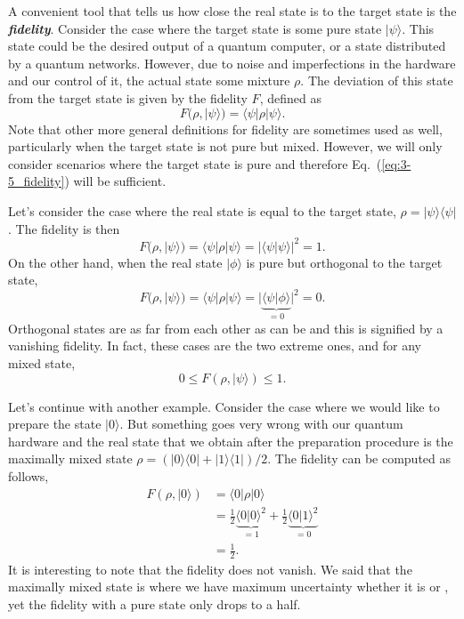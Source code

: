 A convenient tool that tells us how close the real state is to the target state is the \textit{\textbf{fidelity}}.
Consider the case where the target state is some pure state $|\psi\rangle$.
This state could be the desired output of a quantum computer, or a state distributed by a quantum networks.
However, due to noise and imperfections in the hardware and our control of it, the actual state some mixture $\rho$.
The deviation of this state from the target state is given by the fidelity $F$, defined as
\begin{equation}
    F(\rho,|\psi\rangle) = \langle\psi|\rho|\psi\rangle.
    \label{eq:3-5_fidelity}
\end{equation}
Note that other more general definitions for fidelity are sometimes used as well, particularly when the target state is not pure but mixed.
However, we will only consider scenarios where the target state is pure and therefore Eq.~(\ref{eq:3-5_fidelity}) will be sufficient.

Let's consider the case where the real state is equal to the target state, $\rho=|\psi\rangle\langle\psi|$.
The fidelity is then
\begin{equation}
    F(\rho,|\psi\rangle) = \langle\psi|\rho|\psi\rangle = |\langle \psi|\psi \rangle|^2 = 1.
\end{equation}
On the other hand, when the real state $|\phi\rangle$ is pure but orthogonal to the target state,
\begin{equation}
    F(\rho,|\psi\rangle) = \langle\psi|\rho|\psi\rangle = |\underbrace{\langle \psi|\phi \rangle}_{=0}|^2 = 0.
\end{equation}
Orthogonal states are as far from each other as can be and this is signified by a vanishing fidelity.
In fact, these cases are the two extreme ones, and for any mixed state,
\begin{equation}
    0 \leq F(\rho,|\psi\rangle) \leq 1.
\end{equation}

Let's continue with another example.
Consider the case where we would like to prepare the state $|0\rangle$.
But something goes very wrong with our quantum hardware and the real state that we obtain after the preparation procedure is the maximally mixed state $\rho = (|0\rangle\langle0| + |1\rangle\langle1|)/2$.
The fidelity can be computed as follows,
\begin{align}
    F(\rho,|0\rangle) & = \langle 0 | \rho | 0 \rangle \nonumber\\
    & = \frac{1}{2} \underbrace{\langle0|0\rangle^2}_{=1} + \frac{1}{2} \underbrace{\langle0|1\rangle^2}_{=0} \nonumber\\
    & = \frac{1}{2}.
\end{align}
It is interesting to note that the fidelity does not vanish.
We said that the maximally mixed state is where we have maximum uncertainty whether it is  or , yet the fidelity with a pure state only drops to a half.

